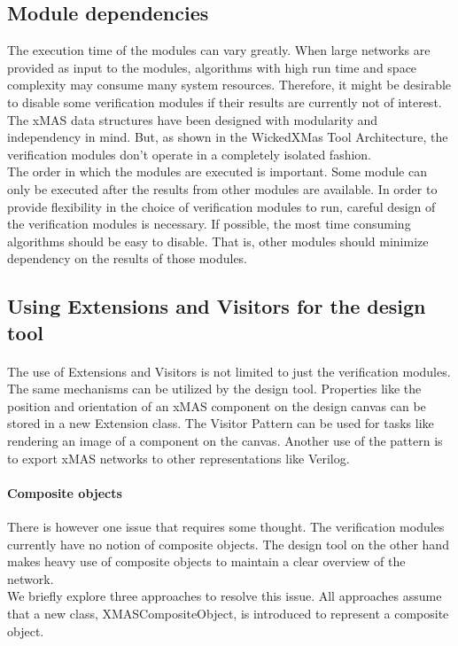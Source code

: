 \documentclass[a4paper,11pt]{article}
\begin{document}
\subsection{Module dependencies}

The execution time of the modules can vary greatly. When large networks are provided as input to the
modules, algorithms with high run time and space complexity may consume many system resources. Therefore,
it might be desirable to disable some verification modules if their results are currently not of interest.\\
The xMAS data structures have been designed with modularity and independency in mind. But, as shown in
the WickedXMas Tool Architecture, the verification modules don't operate in a completely isolated
fashion.\\
The order in which the modules are executed is important. Some module can only be executed after
the results from other modules are available. In order to provide flexibility in the choice of
verification modules to run, careful design of the verification modules is necessary.
If possible, the most time consuming algorithms should be easy to disable. That is, other modules
should minimize dependency on the results of those modules.


\subsection{Using Extensions and Visitors for the design tool}
\label{sec:extensions-visitor-design-tool}

\paragraph{}
The use of Extensions and Visitors is not limited to just the verification modules.
The same mechanisms can be utilized by the design tool. Properties like the
position and orientation of an xMAS component on the design canvas can be
stored in a new Extension class. The Visitor Pattern can be used for
tasks like rendering an image of a component on the canvas. Another use of
the pattern is to export xMAS networks to other representations like Verilog.

\paragraph{Composite objects}
There is however one issue that requires some thought. The verification modules
currently have no notion of composite objects. The design tool on the other hand
makes heavy use of composite objects to maintain a clear overview of the network.\\
We briefly explore three approaches to resolve this issue. All approaches assume that
a new class, XMASCompositeObject, is introduced to represent a composite object.
\end{document}
